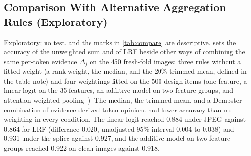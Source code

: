 \subsection{Comparison With Alternative Aggregation Rules (Exploratory)}\label{sec:study2-compare}
Exploratory; no test, and the marks in \cref{tab:compare} are descriptive.
 sets the accuracy of the unweighted sum and of LRF beside other ways of combining the same per-token evidence $\Delta_j$ on the 450 fresh-fold
images: three rules without a fitted weight (a rank weight, the median, and the 20\% trimmed mean, defined in the table note) and four weightings fitted on the 500 design items
(one feature, a linear logit on the 35 features, an additive model on two feature groups, and attention-weighted pooling~\cite{ilse2018attention}).
The median, the trimmed mean, and a Dempster combination of evidence-derived token opinions had lower accuracy than no weighting in every condition.
The linear logit reached 0.884 under JPEG against 0.864 for LRF (difference 0.020, unadjusted 95\% interval 0.004 to 0.038) and 0.931 under the splice against 0.927, and the additive model on two feature groups reached 0.922 on clean images against 0.918.
